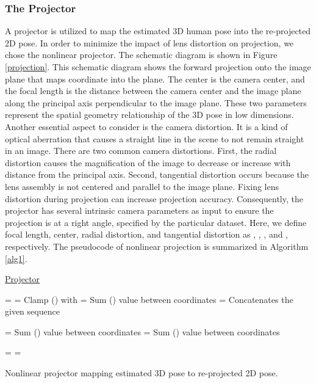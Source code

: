 \documentclass[runningheads]{llncs}
\begin{document}
\subsubsection{The Projector} A projector is utilized to map the estimated 3D human pose into the re-projected 2D pose. In order to minimize the impact of lens distortion on projection, we chose the nonlinear projector. The schematic diagram is shown in Figure \ref{projection}. This schematic diagram shows the forward projection onto the image plane that maps  coordinate into the  plane. The center is the camera center, and the focal length is the distance between the camera center and the image plane along the principal axis perpendicular to the image plane. These two parameters represent the spatial geometry relationship of the 3D pose in low dimensions. Another essential aspect to consider is the camera distortion. It is a kind of optical aberration that causes a straight line in the scene to not remain straight in an image. There are two common camera distortions. First, the radial distortion causes the magnification of the image to decrease or increase with distance from the principal axis. Second, tangential distortion occurs because the lens assembly is not centered and parallel to the image plane. Fixing lens distortion during projection can increase projection accuracy. Consequently, the projector has several intrinsic camera parameters as input to ensure the projection is at a right angle, specified by the particular dataset. Here, we define focal length, center, radial distortion, and tangential distortion as , , , and , respectively. The pseudocode of nonlinear projection is summarized in Algorithm \ref{alg1}. 


\begin{algorithm}

    \underline{Projector} \;
    
     =  \;
     = Clamp () with   \;
     = Sum () value between  coordinates\;
     = Concatenates the given sequence  \;
    
     = Sum () value between  coordinates\;
     = Sum () value between  coordinates\;
    
     =  \;
     =  \;
    \Return 
    
    \caption{Nonlinear projector mapping estimated 3D pose to re-projected 2D pose.}
    \label{alg1}
\end{algorithm}
\end{document}
